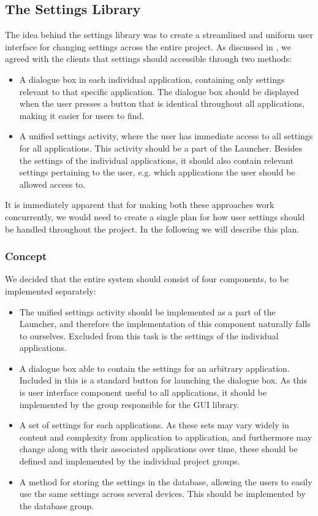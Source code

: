 \subsection{The Settings Library}
The idea behind the settings library was to create a streamlined and uniform user interface for changing settings across the entire \giraf project. As discussed in , we agreed with the clients that settings should accessible through two methods:
\begin{itemize}
	\item A dialogue box in each individual application, containing only settings relevant to that specific application. The dialogue box should be displayed when the user presses a button that is identical throughout all \giraf applications, making it easier for users to find.
	\item A unified settings activity, where the user has immediate access to all settings for all \giraf applications. This activity should be a part of the Launcher. Besides the settings of the individual applications, it should also contain relevant settings pertaining to the user, e.g. which applications the user should be allowed access to.
\end{itemize}

It is immediately apparent that for making both these approaches work concurrently, we would need to create a single plan for how user settings should be handled throughout the \giraf project. In the following we will describe this plan.

\subsubsection{Concept}
We decided that the entire system should consist of four components, to be implemented separately:
\begin{itemize}
	\item The unified settings activity should be implemented as a part of the Launcher, and therefore the implementation of this component naturally falls to ourselves. Excluded from this task is the settings of the individual applications.
	\item A dialogue box able to contain the settings for an arbitrary \giraf application. Included in this is a standard button for launching the dialogue box. As this is user interface component useful to all applications, it should be implemented by the group responsible for the \giraf GUI library.
	\item A set of settings for each \giraf applications. As these sets may vary widely in content and complexity from application to application, and furthermore may change along with their associated applications over time, these should be defined and implemented by the individual project groups. 
	\item A method for storing the settings in the database, allowing the users to easily use the same settings across several devices. This should be implemented by the database group. 
\end{itemize}


